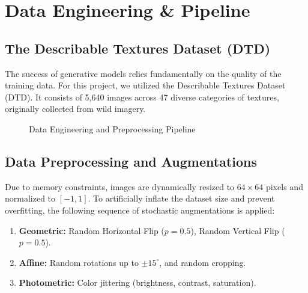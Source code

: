 \documentclass[12pt,a4paper]{article}
\begin{document}
\section{Data Engineering \& Pipeline}

\subsection{The Describable Textures Dataset (DTD)}
The success of generative models relies fundamentally on the quality of the training data. For this project, we utilized the Describable Textures Dataset (DTD). It consists of 5,640 images across 47 diverse categories of textures, originally collected from wild imagery.

\begin{figure}[h]
\centering
{}
\caption{Data Engineering and Preprocessing Pipeline}
\label{fig:data_pipeline}
\end{figure}

\subsection{Data Preprocessing and Augmentations}
Due to memory constraints, images are dynamically resized to $64 \times 64$ pixels and normalized to $[-1, 1]$. To artificially inflate the dataset size and prevent overfitting, the following sequence of stochastic augmentations is applied:
\begin{enumerate}
    \item \textbf{Geometric:} Random Horizontal Flip ($p=0.5$), Random Vertical Flip ($p=0.5$).
    \item \textbf{Affine:} Random rotations up to $\pm 15^\circ$, and random cropping.
    \item \textbf{Photometric:} Color jittering (brightness, contrast, saturation).
\end{enumerate}
\end{document}
